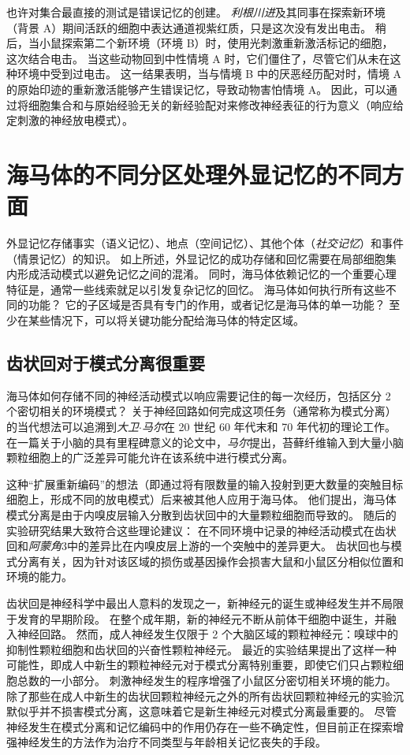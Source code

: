 也许对集合最直接的测试是错误记忆的创建。
\textit{利根川进}及其同事在探索新环境（背景 A）期间活跃的细胞中表达通道视紫红质，只是这次没有发出电击。
稍后，当小鼠探索第二个新环境（环境 B）时，使用光刺激重新激活标记的细胞，这次结合电击。
当这些动物回到中性情境 A 时，它们僵住了，尽管它们从未在这种环境中受到过电击。
这一结果表明，当与情境 B 中的厌恶经历配对时，情境 A 的原始印迹的重新激活能够产生错误记忆，导致动物害怕情境 A。
因此，可以通过将细胞集合和与原始经验无关的新经验配对来修改神经表征的行为意义（响应给定刺激的神经放电模式）。



\section{海马体的不同分区处理外显记忆的不同方面}

外显记忆存储事实（语义记忆）、地点（空间记忆）、其他个体（\textit{社交记忆}）和事件（情景记忆）的知识。
如上所述，外显记忆的成功存储和回忆需要在局部细胞集内形成活动模式以避免记忆之间的混淆。
同时，海马体依赖记忆的一个重要心理特征是，通常一些线索就足以引发复杂记忆的回忆。
海马体如何执行所有这些不同的功能？
它的子区域是否具有专门的作用，或者记忆是海马体的单一功能？
至少在某些情况下，可以将关键功能分配给海马体的特定区域。



\subsection{齿状回对于模式分离很重要}

海马体如何存储不同的神经活动模式以响应需要记住的每一次经历，包括区分 2 个密切相关的环境模式？
关于神经回路如何完成这项任务（通常称为模式分离）的当代想法可以追溯到\textit{大卫$\cdot$马尔}在 20 世纪 60 年代末和 70 年代初的理论工作。
在一篇关于小脑的具有里程碑意义的论文中，\textit{马尔}提出，苔藓纤维输入到大量小脑颗粒细胞上的广泛差异可能允许在该系统中进行模式分离。


这种“扩展重新编码”的想法（即通过将有限数量的输入投射到更大数量的突触目标细胞上，形成不同的放电模式）后来被其他人应用于海马体。
他们提出，海马体模式分离是由于内嗅皮层输入分散到齿状回中的大量颗粒细胞而导致的。
随后的实验研究结果大致符合这些理论建议：
在不同环境中记录的神经活动模式在齿状回和\textit{阿蒙角}3中的差异比在内嗅皮层上游的一个突触中的差异更大。
齿状回也与模式分离有关，因为针对该区域的损伤或基因操作会损害大鼠和小鼠区分相似位置和环境的能力。


齿状回是神经科学中最出人意料的发现之一，新神经元的诞生或神经发生并不局限于发育的早期阶段。
在整个成年期，新的神经元不断从前体干细胞中诞生，并融入神经回路。
然而，成人神经发生仅限于 2 个大脑区域的颗粒神经元：嗅球中的抑制性颗粒细胞和齿状回的兴奋性颗粒神经元。
最近的实验结果提出了这样一种可能性，即成人中新生的颗粒神经元对于模式分离特别重要，即使它们只占颗粒细胞总数的一小部分。
刺激神经发生的程序增强了小鼠区分密切相关环境的能力。
除了那些在成人中新生的齿状回颗粒神经元之外的所有齿状回颗粒神经元的实验沉默似乎并不损害模式分离，这意味着它是新生神经元对模式分离最重要的。
尽管神经发生在模式分离和记忆编码中的作用仍存在一些不确定性，但目前正在探索增强神经发生的方法作为治疗不同类型与年龄相关记忆丧失的手段。



